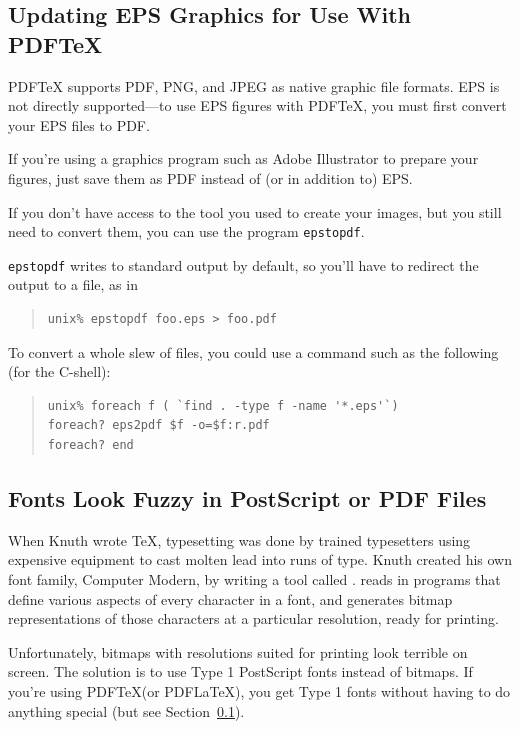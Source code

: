 \documentclass{icmmcm}
\newcommand{\pdftex}{PDF\tex}
\newcommand{\pdflatex}{PDF\latex}
\newcommand{\prog}[1]{\texttt{#1}\xspace}
\newcommand{\tex}{\TeX\xspace}
\newcommand{\latex}{\LaTeX\xspace}
\begin{document}
{\subsection{Updating EPS Graphics for Use With \pdftex}%
\label{sec:pdftex-graphics}

\pdftex supports PDF, PNG, and JPEG as native graphic file
formats.  EPS is not directly supported---to use EPS figures with
\pdftex, you must first convert your EPS files to PDF.

If you're using a graphics program such as Adobe Illustrator to
prepare your figures, just save them as PDF instead of (or in addition
to) EPS.

If you don't have access to the tool you used to create your images,
but you still need to convert them, you can use the program
\prog{epstopdf}.

\prog{epstopdf} writes to standard output by default, so you'll have
to redirect the output to a file, as in
\begin{quote}
\begin{verbatim}
unix% epstopdf foo.eps > foo.pdf
\end{verbatim}
\end{quote}

To convert a whole slew of files, you could use a command such as the
following (for the C-shell):
\begin{quote}
\begin{verbatim}
unix% foreach f ( `find . -type f -name '*.eps'`)
foreach? eps2pdf $f -o=$f:r.pdf
foreach? end
\end{verbatim}
\end{quote}


\subsection{Fonts Look Fuzzy in PostScript or PDF Files}%
\label{sec:fuzzy-fonts}

When Knuth wrote \tex, typesetting was done by trained typesetters
using expensive equipment to cast molten lead into runs of type.
Knuth created his own font family, Computer Modern, by writing a tool
called \MF{}.  \MF{} reads in programs that define various aspects of
every character in a font, and generates bitmap representations of
those characters at a particular resolution, ready for printing.

Unfortunately, bitmaps with resolutions suited for printing look
terrible on screen.  The solution is to use Type 1 PostScript fonts
instead of bitmaps. If you're using \pdftex (or \pdflatex), you get
Type 1 fonts without having to do anything special (but see
Section~\ref{sec:pdftex-graphics}).

}
\end{document}
